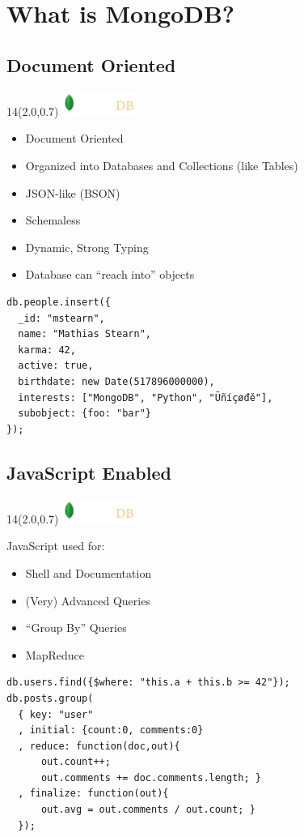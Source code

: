 \documentclass{beamer}
\newcommand{\MongoLogo}{
\begin{textblock}{14}(2.0,0.7)
  \includegraphics[height=0.8cm]{logo-mongodb-ondark.png}
\end{textblock}
}
\begin{document}
\section{What is MongoDB?}
\subsection{Document Oriented}
\begin{frame}[fragile]
  \MongoLogo
  \begin{itemize}
    \item Document Oriented
    \item Organized into Databases and Collections (like Tables)
    \item JSON-like (BSON)
    \item Schemaless
    \item Dynamic, Strong Typing
    \item Database can ``reach into'' objects
  \end{itemize}

  \begin{small}
  \begin{verbatim}
db.people.insert({
  _id: "mstearn",
  name: "Mathias Stearn",
  karma: 42,
  active: true,
  birthdate: new Date(517896000000),
  interests: ["MongoDB", "Python", "Üñíçøđĕ"],
  subobject: {foo: "bar"}
});
  \end{verbatim}
  \end{small}

\end{frame}

\subsection{JavaScript Enabled}
\begin{frame}[fragile]
  \MongoLogo
  JavaScript used for:
  \begin{itemize}
    \item Shell and Documentation
    \item (Very) Advanced Queries
    \item ``Group By'' Queries
    \item MapReduce
  \end{itemize}

  \begin{verbatim}
db.users.find({$where: "this.a + this.b >= 42"});
db.posts.group(
  { key: "user"
  , initial: {count:0, comments:0}
  , reduce: function(doc,out){
      out.count++;
      out.comments += doc.comments.length; }
  , finalize: function(out){ 
      out.avg = out.comments / out.count; }
  });
  \end{verbatim}
\end{frame}
\end{document}
